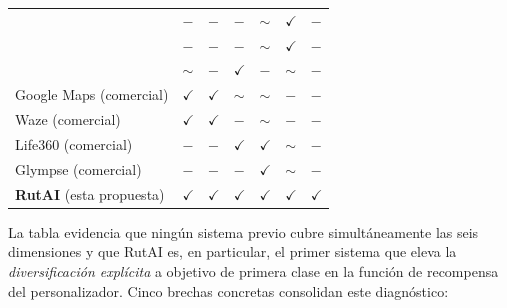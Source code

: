 \documentclass[a4paper,fleqn]{cas-sc}
\newcommand{\RUTAI}{RutAI\xspace}
\begin{document}
\begin{table}[t]
\begin{tabular*}{\tblwidth}{@{}LLLLLLL@{}}
			\citet{mckenzie2022privyto}                    & $-$          & $-$          & $-$          & $\sim$       & $\checkmark$ & $-$ \\
			\citet{shokri2014mobicrowd}                    & $-$          & $-$          & $-$          & $\sim$       & $\checkmark$ & $-$ \\
			\citet{kim2025crimesafetymap}                  & $\sim$       & $-$          & $\checkmark$ & $-$          & $\sim$       & $-$ \\
			Google Maps (comercial)                        & $\checkmark$ & $\checkmark$ & $\sim$       & $\sim$       & $-$          & $-$ \\
			Waze (comercial)                               & $\checkmark$ & $\checkmark$ & $-$          & $\sim$       & $-$          & $-$ \\
			Life360 (comercial)                            & $-$          & $-$          & $\checkmark$ & $\checkmark$ & $\sim$       & $-$ \\
			Glympse (comercial)                            & $-$          & $-$          & $-$          & $\checkmark$ & $\sim$       & $-$ \\
			\textbf{\RUTAI} (esta propuesta)               & $\checkmark$ & $\checkmark$ & $\checkmark$ & $\checkmark$ & $\checkmark$ & $\checkmark$ \\
			\bottomrule
		\end{tabular*}
	\end{table}
	
	La tabla evidencia que ning\'un sistema previo cubre simult\'aneamente las seis dimensiones y que \RUTAI es, en particular, el primer sistema que eleva la \emph{diversificaci\'on expl\'icita} a objetivo de primera clase en la funci\'on de recompensa del personalizador. Cinco brechas concretas consolidan este diagn\'ostico:
	
\end{document}
